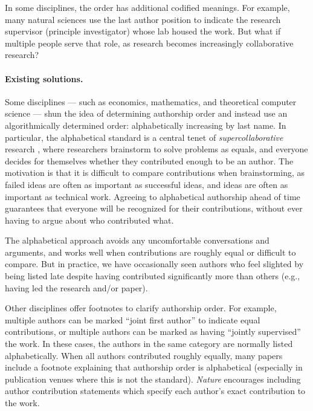 \documentclass[natbib,authoryear]{sigtbd17-style}
\begin{document}
In some disciplines, the order has additional codified meanings.
For example, many natural sciences use the last author position to indicate the
research supervisor (principle investigator) whose lab housed the work.
But what if multiple people serve that role, as research becomes
increasingly collaborative research?

\paragraph{Existing solutions.}

Some disciplines --- such as economics, mathematics, and
theoretical computer science --- shun the idea of determining authorship order
and instead use an algorithmically determined order:
alphabetically increasing by last name.
In particular, the alphabetical standard is a central tenet of
\emph{supercollaborative} research \citep{supercollaboration},
where researchers brainstorm to solve problems as equals,
and everyone decides for themselves whether they contributed
enough to be an author.
The motivation is that it is difficult to compare contributions when
brainstorming, as failed ideas are often as important as successful ideas,
and ideas are often as important as technical work.
Agreeing to alphabetical authorship ahead of time guarantees that everyone
will be recognized for their contributions, without ever having to argue
about who contributed what.

The alphabetical approach avoids any uncomfortable conversations and arguments,
and works well when contributions are roughly equal or difficult to compare.
But in practice, we have occasionally seen authors who feel slighted
by being listed late despite having contributed significantly more than others
(e.g., having led the research and/or paper).

Other disciplines offer footnotes to clarify authorship order. For example,
multiple authors can be marked ``joint first author'' to indicate
equal contributions, or multiple authors can be marked as having
``jointly supervised'' the work.
In these cases, the authors in the same category
are normally listed alphabetically.
When all authors contributed roughly equally,
many papers include a footnote explaining that authorship order is alphabetical
(especially in publication venues where this is not the standard).
\emph{Nature} encourages including author contribution statements which
specify each author's exact contribution to the work.
\end{document}
